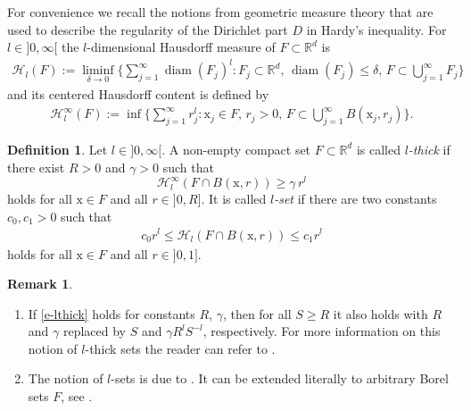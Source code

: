 \documentclass[10pt,leqno]{amsart}
\theoremstyle{definition}
\newtheorem{definition}[theorem]{Definition}
\newtheorem{remark}[theorem]{Remark}
\numberwithin{equation}{section}
\begin{document}
For convenience we recall the notions from geometric measure theory that are
used to describe the regularity of the Dirichlet part $D$ in Hardy's inequality.
For $l\in {]0,\infty[}$ the $l$-dimensional Hausdorff measure of $F \subset
{{\mathbb R}}^d$ is
\begin{align*}
 \mathcal H_l(F):= \liminf_{\delta \to 0} \Big \{ \sum_{j= 1}^\infty
 {\operatorname{diam}}(F_j)^l : F_j \subset {{\mathbb R}}^d,\, {\operatorname{diam}}(F_j) \leq \delta, \, F \subset
 \bigcup_{j=1}^\infty F_j \Big \}
\end{align*}
and its centered Hausdorff content is defined by
\begin{align*}
 \mathcal H_l^\infty(F):= \inf \Big \{ \sum_{j= 1}^\infty r_j^l : {{\mathrm x}}_j 
 \in F, \, r_j > 0, \, F \subset \bigcup_{j=1}^\infty B({{\mathrm x}}_j, r_j) \Big \}.
\end{align*}

\begin{definition} \label{d-lthick}
 Let $l \in {]0,\infty[}$. A non-empty compact set $F \subset {{\mathbb R}}^d$ is called
 \emph{$l$-thick} if there exist $R > 0$ and $\gamma > 0$ such
 that 
 \begin{equation} \label{e-lthick}
 \mathcal H^\infty_l (F \cap B({{\mathrm x}},r) ) \ge \gamma\, r^{l}
 \end{equation}
 holds for all ${{\mathrm x}} \in F$ and all $r \in {]0,R]}$. It is called \emph{$l$-set}
 if there are two constants $c_0, c_1 >0$ such that
 \begin{align*}
  c_0 r^l \le \mathcal H_l(F \cap B({{\mathrm x}},r)) \le c_1 r^l
 \end{align*}
holds for all ${{\mathrm x}} \in F$ and all $r \in {]0,1]}$.
\end{definition}

\begin{remark} \label{r-othconst}
\begin{enumerate}
 \item  If \eqref{e-lthick} holds for constants $R$, $\gamma$, then for all
 $S \ge R$ it also holds with $R$ and $\gamma$ replaced by $S$ and $ \gamma R^l
 S^{-l}$, respectively. For more information on this notion of $l$-thick sets
 the reader can refer to \cite{juha}.
 \item The notion of $l$-sets is due to \cite[Sec.~II.1]{jons}. It can be
 extended literally to arbitrary Borel sets $F$, see \cite[Sec.~VII.1.1]{jons}.
\end{enumerate}
\end{remark}
\end{document}
